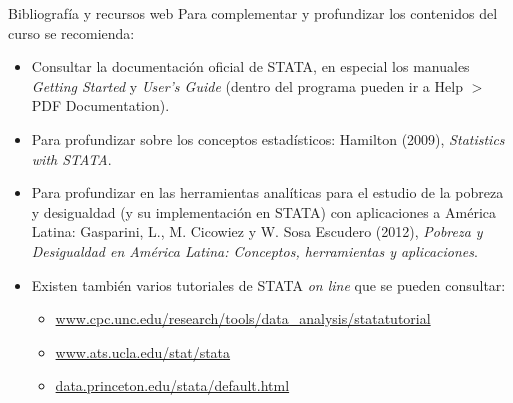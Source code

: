 \documentclass{beamer}
\begin{document}
\begin{frame}[allowframebreaks]{Bibliografía y recursos web}
Para complementar y profundizar los contenidos del curso se recomienda:
\begin{itemize}
\item Consultar la documentación oficial de STATA, en especial los manuales \textit{Getting Started} y \textit{User's Guide} (dentro del programa pueden ir a Help $>$PDF Documentation). 
\item Para profundizar sobre los conceptos estadísticos: Hamilton (2009), \textit{Statistics with STATA}. 
\item Para profundizar en las herramientas analíticas para el estudio de la pobreza y desigualdad (y su implementación en STATA) con aplicaciones a América Latina: Gasparini, L., M. Cicowiez y W. Sosa Escudero (2012), \textit{Pobreza y Desigualdad en América Latina: Conceptos, herramientas y aplicaciones}. 
\item Existen también varios tutoriales de STATA \textit{on line} que se pueden consultar:
\begin{itemize}
\item \url{www.cpc.unc.edu/research/tools/data_analysis/statatutorial}
\item \url{www.ats.ucla.edu/stat/stata}
\item \url{data.princeton.edu/stata/default.html}
\end{itemize}
\end{itemize}
\end{frame}
\end{document}
